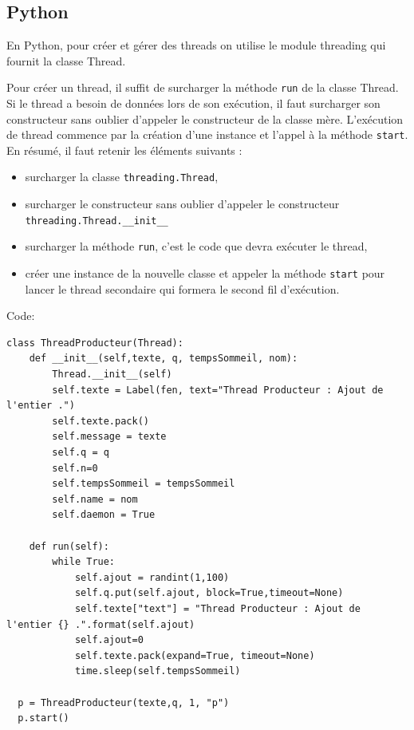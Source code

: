 \documentclass{article}
\begin{document}

\subsection{Python}
En Python, pour créer et gérer des threads on utilise le module threading qui fournit la classe Thread.

Pour créer un thread, il suffit de surcharger la méthode \verb|run| de la classe Thread. Si le thread a besoin de données lors de son exécution, il faut surcharger son constructeur sans oublier d’appeler le constructeur de la classe mère. L’exécution de thread commence par la création d’une instance et l’appel à la méthode \verb|start|. En résumé, il faut retenir les éléments suivants :
\begin{itemize}
\item surcharger la classe \verb|threading.Thread|,
\item surcharger le constructeur sans oublier d’appeler le constructeur \verb|threading.Thread.__init__|
\item surcharger la méthode \verb|run|, c’est le code que devra exécuter le thread,
\item créer une instance de la nouvelle classe et appeler la méthode \verb|start| pour lancer le thread secondaire qui formera le second fil d’exécution.
\end{itemize}

\bigskip Code:

\begin{verbatim}
class ThreadProducteur(Thread):
    def __init__(self,texte, q, tempsSommeil, nom):
        Thread.__init__(self)
        self.texte = Label(fen, text="Thread Producteur : Ajout de l'entier .")
        self.texte.pack()
        self.message = texte
        self.q = q
        self.n=0
        self.tempsSommeil = tempsSommeil
        self.name = nom
        self.daemon = True

    def run(self):
        while True:
            self.ajout = randint(1,100)
            self.q.put(self.ajout, block=True,timeout=None)
            self.texte["text"] = "Thread Producteur : Ajout de l'entier {} .".format(self.ajout)
            self.ajout=0
            self.texte.pack(expand=True, timeout=None)
            time.sleep(self.tempsSommeil)
            
  p = ThreadProducteur(texte,q, 1, "p")
  p.start()
\end{verbatim}
\end{document}
